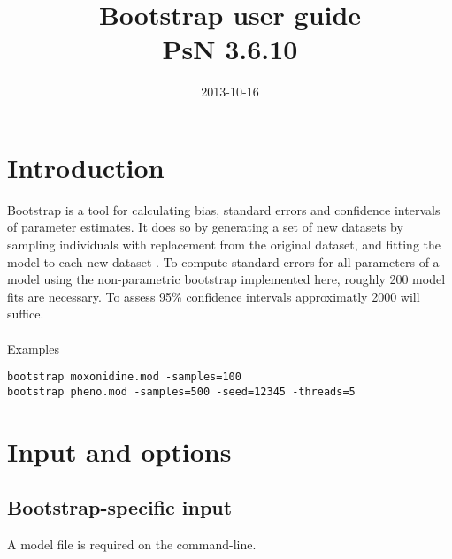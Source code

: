 \documentclass[a4paper,12pt]{article}
\title{Bootstrap user guide\\ \vspace{2 mm} {\large PsN 3.6.10}}
\date{2013-10-16}
\begin{document}
\maketitle


\section{Introduction}

Bootstrap is a tool for calculating bias, standard errors and confidence intervals of parameter estimates. It does so by generating a set of new datasets by sampling individuals with replacement from the original dataset, and fitting the model to each new dataset \cite{Efron}. To compute standard errors for all parameters of a model using the non-parametric bootstrap implemented here, roughly 200 model fits are necessary. To assess 95\% confidence intervals approximatly 2000 will suffice.
\\
\\
Examples
\begin{verbatim}
bootstrap moxonidine.mod -samples=100
bootstrap pheno.mod -samples=500 -seed=12345 -threads=5
\end{verbatim}

\section{Input and options}

\subsection{Bootstrap-specific input}
A model file is required on the command-line.
\end{document}
